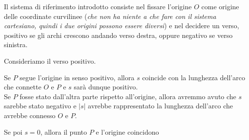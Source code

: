 \documentclass[11pt,a4paper,twoside]{article}
\theoremstyle{definition}
\begin{document}
\begin{center}
\end{center}

Il sistema di riferimento introdotto consiste nel fissare l'origine $O$ come origine delle coordinate curvilinee (\textit{che non ha niente a che fare con il sistema cartesiano, quindi i due origini possono essere diversi}) e nel decidere un verso, positivo se gli archi crescono andando verso destra, oppure negativo se verso sinistra.

Consideriamo il verso positivo.

\begin{center}
\end{center}

Se $P$ segue l'origine in senso positivo, allora $s$ coincide con la lunghezza dell'arco che connette $O$ e $P$ e $s$ sarà dunque positivo.\\
Se $P$ fosse stato dall'altra parte rispetto all'origine, allora avremmo avuto che $s$ sarebbe stato negativo e $|s|$ avrebbe rappresentato la lunghezza dell'arco che avrebbe connesso $O$ e $P$.

Se poi $s=0$, allora il punto $P$ e l'origine coincidono
\end{document}
